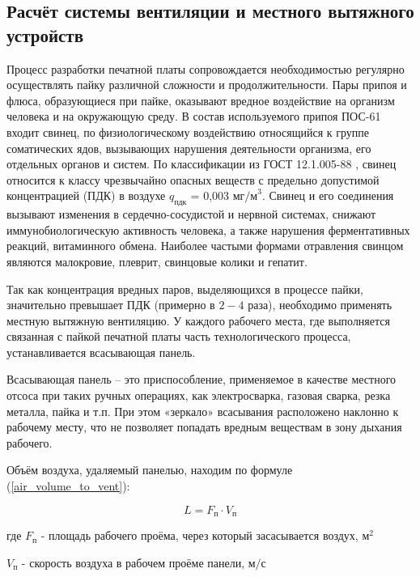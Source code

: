 \newpage

\subsection{Расчёт системы вентиляции и местного вытяжного устройств}

Процесс разработки печатной платы сопровождается необходимостью регулярно
осуществлять пайку различной сложности и продолжительности.
Пары припоя и флюса, образующиеся при пайке, оказывают вредное воздействие на
организм человека и на окружающую среду. В состав используемого припоя ПОС-61
входит свинец, по физиологическому воздействию относящийся к группе соматических
ядов, вызывающих нарушения деятельности организма, его отдельных органов и систем.
По классификации из ГОСТ 12.1.005-88 \cite{ecology_gost_005_88}, свинец относится
к классу чрезвычайно опасных веществ с предельно допустимой концентрацией (ПДК)
в воздухе $q_\text{пдк}$ = 0,003 $\text{мг/м}^3$.
Свинец и его соединения вызывают изменения в сердечно-сосудистой и нервной системах,
снижают иммунобиологическую активность человека, а также нарушения ферментативных
реакций, витаминного обмена. Наиболее частыми формами отравления свинцом являются
малокровие, плеврит, свинцовые колики и гепатит.

Так как концентрация вредных паров, выделяющихся в процессе пайки, значительно
превышает ПДК (примерно в $2 - 4$ раза), необходимо применять местную вытяжную вентиляцию.
У каждого рабочего места, где выполняется связанная с пайкой печатной платы часть
технологического процесса, устанавливается всасывающая панель.

Всасывающая панель – это приспособление, применяемое в качестве местного отсоса
при таких ручных операциях, как электросварка, газовая сварка, резка металла,
пайка и т.п. При этом «зеркало» всасывания расположено наклонно к рабочему месту,
что не позволяет попадать вредным веществам в зону дыхания рабочего.

Объём воздуха, удаляемый панелью, находим по формуле (\ref{air_volume_to_vent}):

\begin{equation}
\label{air_volume_to_vent}
    L = F_\text{п} \cdot V_\text{п}
\end{equation}

где $F_\text{п}$ - площадь рабочего проёма, через который засасывается воздух, $\text{м}^2$

$V_\text{п}$ - скорость воздуха в рабочем проёме панели, $\text{м/с}$

